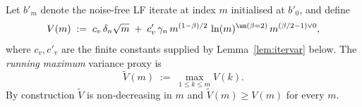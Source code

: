 %
%


\begin{definition}\label{def:Vm}
Let $b'_m$ denote the noise-free LF iterate at index $m$ initialised at $b'_0$,
and define
\begin{equation}\label{eq:Vm}
V(m) \;:=\; c_v\,\delta_n\sqrt{m} \;+\; c'_v\,\gamma_n\,
        m^{(1-\beta)/2}\,\ln(m)^{\un(\beta = 2)}\,m^{(\beta/2-1)\vee 0},
\end{equation}
where $c_v, c'_v$ are the finite constants supplied by
Lemma~\ref{lem:itervar} below. The \emph{running maximum} variance proxy is
\begin{equation}\label{eq:Vtilde}
\tilde V(m) \;:=\; \max_{1 \le k \le m} V(k).
\end{equation}
By construction $\tilde V$ is non-decreasing in $m$ and $\tilde V(m) \ge V(m)$
for every $m$.
\end{definition}

